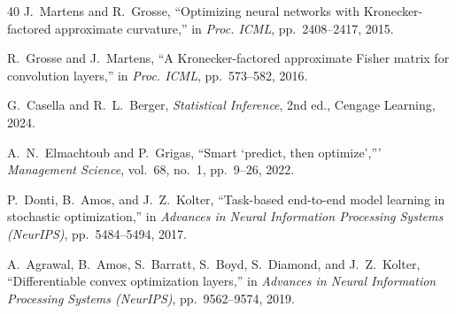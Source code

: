 \documentclass[journal]{IEEEtran}
\begin{document}
\begin{thebibliography}{40}
J.~Martens and R.~Grosse, ``Optimizing neural networks with
Kronecker-factored approximate curvature,'' in \emph{Proc. ICML},
pp.~2408--2417, 2015.

R.~Grosse and J.~Martens, ``A Kronecker-factored approximate Fisher
matrix for convolution layers,'' in \emph{Proc. ICML}, pp.~573--582,
2016.

G.~Casella and R.~L.~Berger, \emph{Statistical Inference}, 2nd ed.,
Cengage Learning, 2024.

A.~N.~Elmachtoub and P.~Grigas, ``Smart `predict, then optimize','''
\emph{Management Science}, vol.~68, no.~1, pp.~9--26, 2022.

P.~Donti, B.~Amos, and J.~Z.~Kolter, ``Task-based end-to-end model
learning in stochastic optimization,'' in \emph{Advances in Neural
Information Processing Systems (NeurIPS)}, pp.~5484--5494, 2017.

A.~Agrawal, B.~Amos, S.~Barratt, S.~Boyd, S.~Diamond, and J.~Z.~Kolter,
``Differentiable convex optimization layers,'' in \emph{Advances in
Neural Information Processing Systems (NeurIPS)}, pp.~9562--9574, 2019.

\end{thebibliography}
\end{document}
